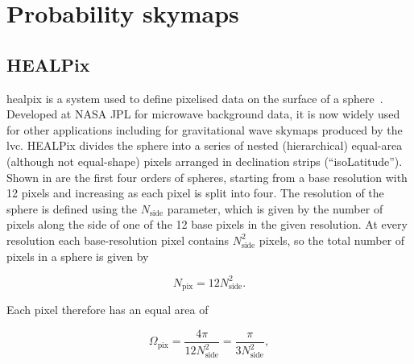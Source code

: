 
\newpage
\section{Probability skymaps}
\label{sec:mapping_the_sky}
\begin{colsection}


\begin{colsection}


\end{colsection}


\subsection{HEALPix}
\label{sec:healpix}
\begin{colsection}

\gls{healpix} is a system used to define pixelised data on the surface of a sphere~\citep{HEALPix}. Developed at NASA JPL for microwave background data, it is now widely used for other applications including for gravitational wave skymaps produced by the \gls{lvc}. HEALPix divides the sphere into a series of nested (hierarchical) equal-area (although not equal-shape) pixels arranged in declination strips (``isoLatitude''). Shown in  are the first four orders of spheres, starting from a base resolution with 12 pixels and increasing as each pixel is split into four. The resolution of the sphere is defined using the $N_\text{side}$ parameter, which is given by the number of pixels along the side of one of the 12 base pixels in the given resolution. At every resolution each base-resolution pixel contains $N_\text{side}^2$ pixels, so the total number of pixels in a sphere is given by

\begin{equation}
    N_\text{pix} = 12 N_\text{side}^2.
    \label{eq:healpix_npix}
\end{equation}

Each pixel therefore has an equal area of

\begin{equation}
    \Omega_\text{pix} = \frac{4\pi}{12 N_\text{side}^2} = \frac{\pi}{3 N_\text{side}^2},
    \label{eq:healpix_area}
\end{equation}


\end{colsection}
\end{colsection}
